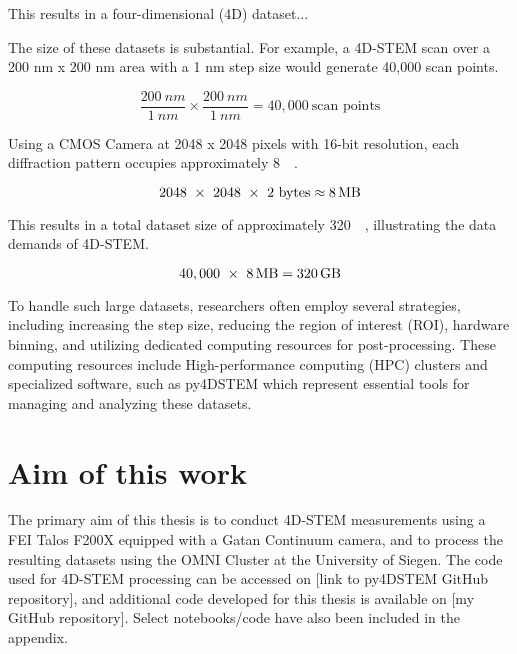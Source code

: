 This results in a four-dimensional (4D) dataset...




The size of these datasets is substantial. For example, a 4D-STEM scan over a 200 nm x 200 nm area with a 1 nm step size would generate 40,000 scan points. 

\begin{equation}
    \frac{200 \ nm}{1 \ nm} \times \frac{200 \ nm}{1 \ nm} = 40,000 \ \text{scan points}  
\end{equation}

Using a CMOS Camera at 2048 x 2048 pixels with 16-bit resolution, each diffraction pattern occupies approximately \SI{8}{\mega\byte}.

\begin{equation}
    2048 \ \times \ 2048 \ \times \ 2 \ \text{bytes} \approx \SI{8}{\mega\byte}
\end{equation}

This results in a total dataset size of approximately \SI{320}{\giga\byte}, illustrating the data demands of 4D-STEM.

\begin{equation}
    40,000 \ \times \ \SI{8}{\mega\byte} = \SI{320}{\giga\byte}
\end{equation}

To handle such large datasets, researchers often employ several strategies, including increasing the step size, reducing the region of interest (ROI), hardware binning, and utilizing dedicated computing resources for post-processing. 
These computing resources include High-performance computing (HPC) clusters and specialized software, such as py4DSTEM which represent essential tools for managing and analyzing these datasets.



\section{Aim of this work}

The primary aim of this thesis is to conduct 4D-STEM measurements using a FEI Talos F200X equipped with a Gatan Continuum camera, and to process the resulting datasets using the OMNI Cluster at the University of Siegen.
The code used for 4D-STEM processing can be accessed on [link to py4DSTEM GitHub repository], and additional code developed for this thesis is available on [my GitHub repository]. 
Select notebooks/code have also been included in the appendix.
